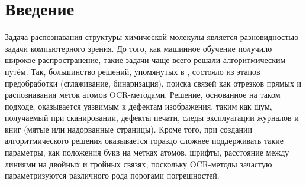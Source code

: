 \chapter*{Введение} %


Задача распознавания структуры химической молекулы является разновидностью задачи компьютерного зрения. До того, как машинное обучение получило широкое распространение, такие задачи чаще всего решали алгоритмическим путём. Так, большинство решений, упомянутых в \cite{rajan2020review}, состояло из этапов предобработки (сглаживание, бинаризация), поиска связей как отрезков прямых и распознавания меток атомов OCR-методами. Решение, основанное на таком подходе, оказывается уязвимым к дефектам изображения, таким как шум, получаемый при сканировании, дефекты печати, следы эксплуатации журналов и книг (мятые или надорванные страницы). Кроме того, при создании алгоритмического решения оказывается гораздо сложнее поддерживать такие параметры, как положения букв на метках атомов, шрифты, расстояние между линиями на двойных и тройных связях,
поскольку OCR-методы зачастую параметризуются различного рода порогами погрешностей.

